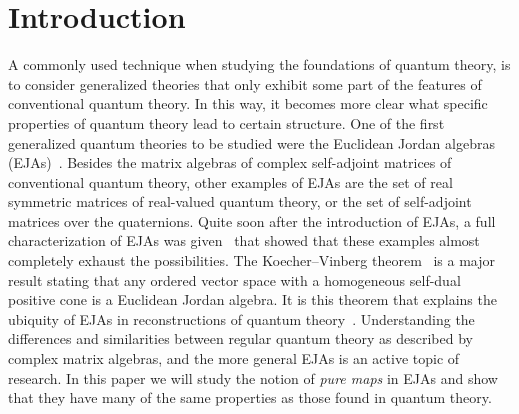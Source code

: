 \documentclass[submission,copyright,creativecommons]{eptcs}
\title{\titlerunning}
\author{Abraham Westerbaan
\institute{Radboud Universiteit}
\email{bram@westerbaan.name} \and
    Bas Westerbaan
\institute{Radboud Universiteit}
\email{bas@westerbaan.name} \and
    John van de Wetering
\institute{Radboud Universiteit}
\email{wetering@cs.ru.nl}
}
\theoremstyle{definition}
\begin{document}
\maketitle

\begin{abstract}
We propose a definition of purity for positive linear maps between 
Euclidean Jordan Algebras (EJA) that generalizes the notion of 
purity for quantum systems. 
We show that this definition of purity is closed under composition
and taking adjoints and thus that the pure maps form a dagger category
(which sets it apart from other possible definitions.)
In fact, from the results presented in this paper, it follows that
    the category of EJAs with positive contractive
linear maps is a \emph{$\dagger$-effectus}, a type of structure originally
defined to study von Neumann algebras in an abstract categorical setting.
In combination with previous work this
characterizes EJAs as the most general systems allowed in a 
generalized probabilistic theory that is simultaneously a $\dagger$-effectus.
Using the dagger structure we get a notion of $\dagger$-positive maps 
of the form~$f = g^\dagger \circ g$. We give a complete characterization of
the pure $\dagger$-positive maps and show that these correspond precisely to
the Jordan algebraic version of the sequential product~$(a,b)\mapsto \sqrt{a}b\sqrt{a}$. 
The notion of $\dagger$-positivity therefore characterizes the sequential product.
\end{abstract}

\section{Introduction}
A commonly used technique when studying the foundations of quantum theory, is to consider generalized theories that only exhibit some part of the features of conventional quantum theory. 
In this way, it becomes more clear what specific properties of quantum theory lead to certain structure. 
One of the first generalized quantum theories to be studied were the Euclidean Jordan algebras (EJAs)~\cite{jordan1933}. 
Besides the matrix algebras of complex self-adjoint matrices of conventional quantum theory, other examples of EJAs are the set of real symmetric matrices of real-valued quantum theory, or the set of self-adjoint matrices over the quaternions. 
Quite soon after the introduction of EJAs, a full characterization of EJAs was given~\cite{jordan1993algebraic} that showed that these examples almost completely exhaust the possibilities. 
The Koecher--Vinberg theorem~\cite{koecher1957positivitatsbereiche} is a major result stating that any ordered vector space with a homogeneous self-dual positive cone is a Euclidean Jordan algebra. 
It is this theorem that explains the ubiquity of EJAs in reconstructions of quantum theory~\cite{barnum2014higher,wetering2018reconstruction,masanes2014entanglement,wilce2016royal,selby2018reconstructing,wetering2018sequential}.
Understanding the differences and similarities between regular quantum theory as described by complex matrix algebras, and the more general EJAs is an active topic of research. In this paper we will study the notion of \emph{pure maps} in EJAs and show that they have many of the same properties as those found in quantum theory.
\end{document}
